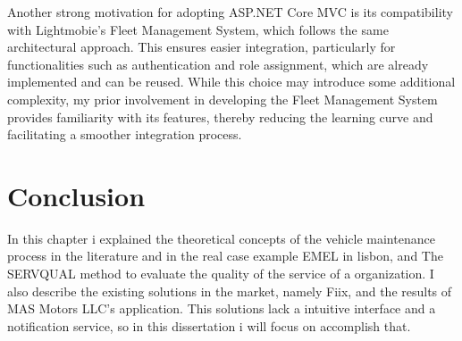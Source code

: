 Another strong motivation for adopting ASP.NET Core MVC is its compatibility with Lightmobie's Fleet Management System, which follows the same architectural approach. This ensures easier integration, particularly for functionalities such as authentication and role assignment, which are already implemented and can be reused. While this choice may introduce some additional complexity, my prior involvement in developing the Fleet Management System provides familiarity with its features, thereby reducing the learning curve and facilitating a smoother integration process.
  

\section{Conclusion}

In this chapter i explained the theoretical concepts of the vehicle maintenance process in the literature and in the real case example EMEL in lisbon, and The SERVQUAL method to evaluate the quality of the service of a organization.
I also describe the existing solutions in the market, namely Fiix, and the results of MAS Motors LLC's application.
This solutions lack a intuitive interface and a notification service, so in this dissertation i will focus on accomplish that.

